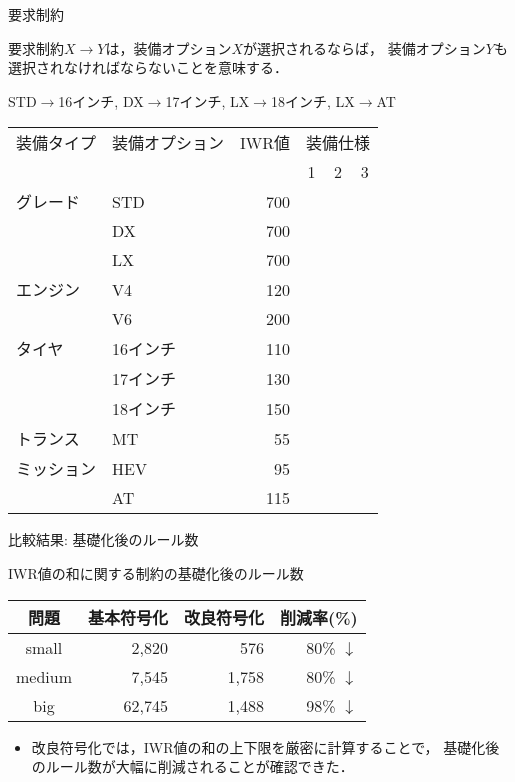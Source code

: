 \documentclass[dvipdfmx, 11pt,]{beamer}
\begin{document}
\begin{frame}{要求制約}
 \begin{alertblock}{}
  要求制約$X\longrightarrow Y$は，装備オプション$X$が選択されるならば，
  装備オプション$Y$も選択されなければならないことを意味する．
 \end{alertblock}
 \begin{center}
  STD$\longrightarrow$16インチ,\quad
  DX$\longrightarrow$17インチ,\quad
  LX$\longrightarrow$18インチ,\quad
  LX$\longrightarrow$AT
 \end{center}
 \begin{exampleblock}{}\small
  \centering
  \begin{tabular}{l|l|r|c|c|c} %
   装備タイプ	& 装備オプション 	& IWR値	& \multicolumn{3}{c}{装備仕様} \\\cline{4-6}
                &		&	& 1	& 2	& 3	\\\cline{1-6}
   グレード 	& STD 		& 700	& \OK	&	&	\\\cline{2-6}
                & DX 		& 700	&	& \OK	&	\\\cline{2-6}	
                & LX 		& 700	& 	&	& \OK	\\\cline{1-6}
   エンジン	& V4 		& 120	&	&	& \OK	\\\cline{2-6}
                & V6 		& 200	& \OK	& \OK	& \\\cline{1-6}
   タイヤ	& 16インチ	& 110	&  \OK	&	&	\\\cline{2-6}
                & 17インチ 	& 130	&	& \OK	&	\\\cline{2-6}
                & 18インチ 	& 150	& &	& \OK	\\\cline{1-6}
   トランス	& MT		& 55	&	 &  &	\\\cline{2-6}
   ミッション	& HEV 	        & 95	& \OK	& \OK	&	\\\cline{2-6}
                & AT 		& 115	&	& 	& \OK %
  \end{tabular}
 \end{exampleblock}
\end{frame}

\begin{frame}{比較結果: 基礎化後のルール数} 
 \begin{exampleblock}{IWR値の和に関する制約の基礎化後のルール数} \centering 
  \begin{tabular}{c|r|r|r}
   問題 	& 基本符号化 	& 改良符号化 & 削減率(\%)	\\\hline
   small 	& 2,820		& \alert{576} & 80\% $\downarrow$ \\
   medium 	& 7,545		& \alert{1,758} & 80\% $\downarrow$ \\
   big 		& 62,745	& \alert{1,488} & 98\% $\downarrow$ \\
  \end{tabular}
 \end{exampleblock}
 \begin{itemize}
  \item 改良符号化では，IWR値の和の上下限を厳密に計算することで，
	基礎化後のルール数が大幅に削減されることが確認できた．
 \end{itemize}
\end{frame}
\end{document}
